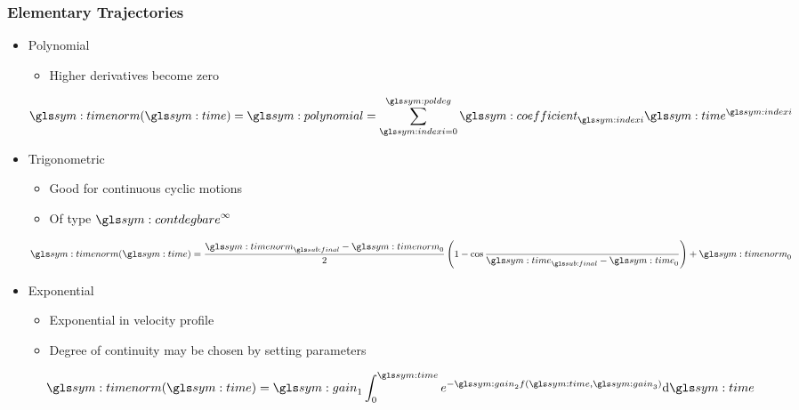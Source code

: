 \documentclass{beamer}
\begin{document}
	\begin{frame}
		\frametitle{Elementary Trajectories}

		\begin{itemize}

			\item

				Polynomial

				\begin{itemize}



					\item

						Higher derivatives become zero

				\end{itemize}

				\begin{equation}
					\timenorm(\timesym)
						= \polynomial
						= \sum_{\indexi=0}^{\poldeg}
						\coefficient_{\indexi} \timesym^{\indexi}
				\end{equation}

			\item

				Trigonometric

				\begin{itemize}

					\item

						Good for continuous cyclic motions

					\item

						Of type $\contdeg{\infty}$
				\end{itemize}

				\begin{equation}
					\timenorm(\timesym) =
						\frac{%
								\timenorm_{\final} - \timenorm_0
							}
							{%
								2
							}
						\left(
							1 - \cos
								\frac{%
									}
									{%
										\timesym_{\final} - \timesym_0
									}
						\right)
						+ \timenorm_0
				\end{equation}

			\item

				Exponential

				\begin{itemize}

					\item

						Exponential in velocity profile

					\item

						Degree of continuity may be chosen by setting parameters
				\end{itemize}

				\begin{equation}
					\timenorm(\timesym) = \gain_1\int_{0}^{\timesym}
						e^{-\gain_2 f(\timesym, \gain_3)} \der \timesym
				\end{equation}

		\end{itemize}
	\end{frame}
\end{document}

